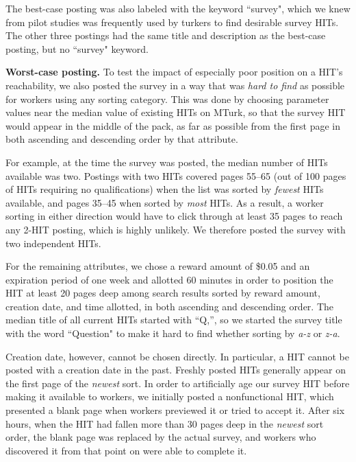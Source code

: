\documentclass{sig-alternate}
\begin{document}
The best-case posting was also labeled with the keyword ``survey",
which we knew from pilot studies was frequently used by turkers to
find desirable survey HITs.  The other three postings had the same
title and description as the best-case posting, but no ``survey"
keyword.


{\bf Worst-case posting.} To test the impact of especially poor
position on a HIT's reachability, we also posted the survey in a way
that was {\em hard to find} as possible for workers using any sorting
category.  This was done by choosing parameter values near the median
value of existing HITs on MTurk, so that the survey HIT would appear
in the middle of the pack, as far as possible from the first page in
both ascending and descending order by that attribute.

For example, at the time the survey was posted, the median number of
HITs available was two.  Postings with two HITs covered pages 55--65
(out of 100 pages of HITs requiring no qualifications) when the list
was sorted by {\em fewest} HITs available, and pages 35--45 when
sorted by {\em most} HITs.  As a result, a worker sorting in either
direction would have to click through at least 35 pages to reach any
2-HIT posting, which is highly unlikely.  We therefore posted the
survey with two independent HITs.

For the remaining attributes, we chose a reward amount of \$0.05 and
an expiration period of one week and allotted 60 minutes in order to
position the HIT at least 20 pages deep among search results sorted by
reward amount, creation date, and time allotted, in both ascending and
descending order.  The median title of all current HITs started with
``Q,'', so we started the survey title with the word ``Question" to
make it hard to find whether sorting by {\em a-z} or {\em z-a}.

Creation date, however, cannot be chosen directly.  In particular, a
HIT cannot be posted with a creation date in the past.  Freshly posted
HITs generally appear on the first page of the {\em newest} sort.  In
order to artificially age our survey HIT before making it available to
workers, we initially posted a nonfunctional HIT, which presented a
blank page when workers previewed it or tried to accept it.  After six
hours, when the HIT had fallen more than 30 pages deep in the {\em
  newest} sort order, the blank page was replaced by the actual
survey, and workers who discovered it from that point on were able to
complete it.
\end{document}
